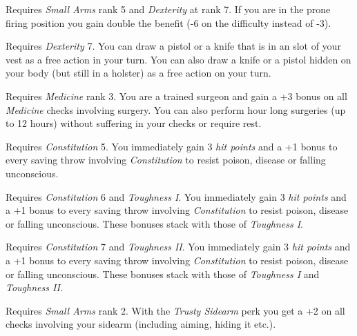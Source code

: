 \begin{description}
   Requires \emph{Small Arms} rank 5 and \emph{Dexterity}
  at rank 7. If you are in the prone firing position you gain double the
  benefit (-6 on the difficulty instead of -3).

   Requires \emph{Dexterity} 7. You can draw a
  pistol or a knife that is in an slot of your vest as a free action
  in your turn. You can also draw a knife or a pistol hidden on your
  body (but still in a holster) as a free action on your turn.

   Requires \emph{Medicine} rank 3. You are a trained
  surgeon and gain a +3 bonus on all \emph{Medicine} checks involving
  surgery. You can also perform hour long surgeries (up to 12 hours)
  without suffering in your checks or require rest.

   Requires \emph{Constitution} 5. You immediately gain
  3 \emph{hit points} and a +1 bonus to every saving throw involving
  \emph{Constitution} to resist poison, disease or falling unconscious.

   Requires \emph{Constitution} 6 and \emph{Toughness
    I}. You immediately gain 3 \emph{hit points} and a +1 bonus to every
  saving throw involving \emph{Constitution} to resist poison, disease or
  falling unconscious. These bonuses stack with those of \emph{Toughness I}.

   Requires \emph{Constitution} 7 and \emph{Toughness
    II}. You immediately gain 3 \emph{hit points} and a +1 bonus to every
  saving throw involving \emph{Constitution} to resist poison, disease or
  falling unconscious. These bonuses stack with those of \emph{Toughness I} and
  \emph{Toughness II}.

   Requires \emph{Small Arms} rank 2. With the
  \emph{Trusty Sidearm} perk you get a +2 on all checks involving your
  sidearm (including aiming, hiding it etc.).

\end{description}
